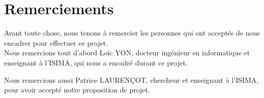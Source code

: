 \cleardoublepage



\chapter*{Remerciements}

\thispagestyle{empty}



Avant toute chose, nous tenons à remercier les personnes qui ont acceptés de nous encadrer pour effectuer ce projet.
\\


Nous remercions tout d'abord Loïc YON, docteur ingénieur en informatique et enseignant à l'ISIMA, qui nous a encadré durant ce projet.

Nous remercions aussi Patrice LAURENÇOT, chercheur et enseignant à l'ISIMA, pour avoir accepté notre proposition de projet.
\\
